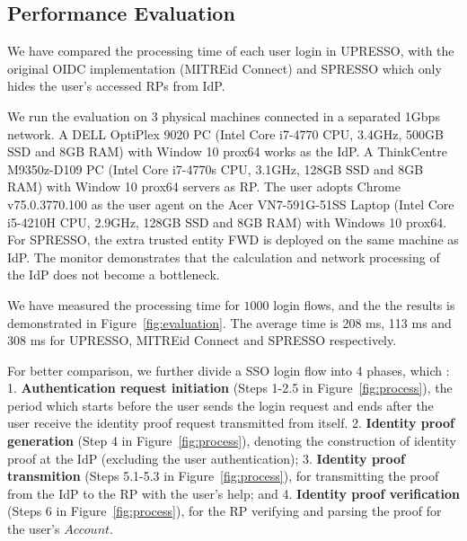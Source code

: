 \subsection{Performance Evaluation}
\label{sec:evaluation}
We have compared the processing time of each user login in UPRESSO, with the original OIDC implementation (MITREid Connect) and SPRESSO which only hides the user's accessed RPs from IdP.

We run the evaluation on 3 physical machines connected in a separated 1Gbps network. A DELL OptiPlex 9020 PC (Intel Core i7-4770 CPU, 3.4GHz, 500GB SSD and 8GB RAM) with Window 10 prox64 works as the IdP. A ThinkCentre M9350z-D109 PC (Intel Core i7-4770s CPU, 3.1GHz, 128GB SSD and 8GB RAM) with  Window 10 prox64 servers as RP. The user adopts Chrome v75.0.3770.100 as the user agent on the Acer VN7-591G-51SS Laptop (Intel Core i5-4210H CPU, 2.9GHz, 128GB SSD and 8GB RAM) with  Windows 10 prox64. For SPRESSO, the extra trusted entity FWD is deployed on the same machine as IdP. The monitor demonstrates that  the calculation and network processing of the IdP does not become a bottleneck.

We have measured the processing time for $1000$ login flows, and the the results is demonstrated in Figure~\ref{fig:evaluation}. The average time is 208 ms, 113 ms and 308 ms for UPRESSO, MITREid Connect and SPRESSO respectively.


For better comparison, we further divide a SSO login flow into 4 phases, which : 1. \textbf{Authentication request initiation} (Steps 1-2.5 in Figure~\ref{fig:process}), the period which starts before the user sends the login request and ends after the user receive the identity proof request transmitted from itself.
2. \textbf{Identity proof generation} (Step 4 in Figure~\ref{fig:process}), denoting the construction of identity proof at the IdP (excluding the user authentication); 3. \textbf{Identity proof transmition} (Steps 5.1-5.3 in Figure~\ref{fig:process}), for transmitting the proof from the IdP to the RP with the user's help; and 4. \textbf{Identity proof verification} (Steps 6 in Figure~\ref{fig:process}), for the RP  verifying and parsing the proof for the user's $Account$. 



